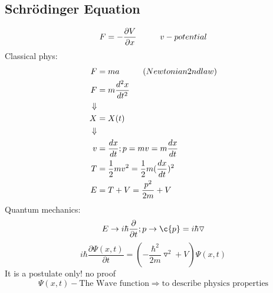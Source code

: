 \documentclass[12pt, a4paper]{article}
\newcommand{\tab}[1][1cm]{\hspace*{#1}}
\begin{document}
\subsection{Schr\"odinger Equation}
\begin{equation}
F=-\frac{\partial V}{\partial x} \tab v-potential
\end{equation}
Classical phys: 
\begin{align*}
F&=ma \tab (Newtonian 2nd law)\\
F&=m\frac{d^2x}{dt^2}\\
\Downarrow\\
X&=X(t)\\
\Downarrow\\
v&=\frac{dx}{dt};p=mv=m\frac{dx}{dt}\\
T&=\frac{1}{2	}mv^2=\frac{1}{2}m(\frac{dx}{dt})^2\\
E&=T+V=\frac{p^2}{2m}+V
\end{align*}
Quantum mechanics:
$$E\rightarrow i\hbar \frac{\partial}{\partial t}; p\rightarrow \c{p}=i\hbar \triangledown$$
\begin{equation}
i\hbar \frac{\partial \Psi(x,t)}{\partial t} =\left( -\frac{\hbar^2}{2m}\triangledown^2+V \right)\Psi(x,t)
\end{equation}
It is a postulate only! no proof
$$\Psi(x,t) - \text{The Wave function} \Rightarrow \text{to describe physics properties}$$
\end{document}
